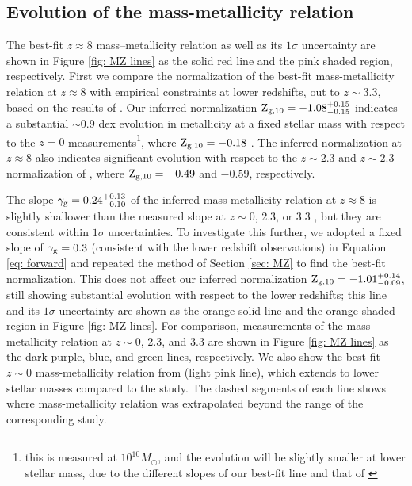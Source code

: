 \documentclass[twocolumn]{aastex631}
\begin{document}
\subsection{Evolution of the mass-metallicity relation} \label{sec: MZR}

The best-fit $z \approx 8$ mass--metallicity relation as well as its $1\sigma$ uncertainty are shown in Figure \ref{fig: MZ lines} as the solid red line and the pink shaded region, respectively. First we compare the normalization of the best-fit mass-metallicity relation at $z \approx 8$ with empirical constraints at lower redshifts, out to $z \sim 3.3$, based on the results of \cite{sanders+2021}. Our inferred normalization $\textnormal{Z}_{\textnormal{\scriptsize g,10}} = -1.08^{+0.15}_{-0.15}$ indicates a substantial $\sim 0.9$ dex evolution in metallicity at a fixed stellar mass with respect to the $z = 0$ measurements\footnote{this is measured at $10^{10} M_{\odot}$, and the evolution will be slightly smaller at lower stellar mass, due to the different slopes of our best-fit line and that of \cite{sanders+2021}}, where $\textnormal{Z}_{\textnormal{\scriptsize g,10}} = -0.18$ \citep[see also,][]{ma+2016, maiolino+2019}. The inferred normalization at $z \approx 8$ also indicates significant evolution with respect to the $z \sim 2.3$ and $z \sim 2.3$ normalization of \cite{sanders+2021}, where $\textnormal{Z}_{\textnormal{\scriptsize g,10}} = -0.49$ and $-0.59$, respectively.

The slope $\gamma_{\textnormal{\scriptsize g}} = 0.24^{+0.13}_{-0.10}$ of the inferred mass-metallicity relation at $z \approx 8$ is slightly shallower than the measured slope at $z \sim 0$, 2.3, or 3.3 \citep[0.28, 0.30, 0.29, respectively; see][]{sanders+2021}, but they are consistent within $1\sigma$ uncertainties. To investigate this further, we adopted a fixed slope of $\gamma_{\textnormal{\scriptsize g}} = 0.3$ (consistent with the lower redshift observations) in Equation \ref{eq: forward} and repeated the method of Section \ref{sec: MZ} to find the best-fit normalization. This does not affect our inferred normalization $\textnormal{Z}_{\textnormal{\scriptsize g,10}} = -1.01^{+0.14}_{-0.09}$, still showing substantial evolution with respect to the lower redshifts; this line and its $1\sigma$ uncertainty are shown as the orange solid line and the orange shaded region in Figure \ref{fig: MZ lines}.
For comparison, \cite{sanders+2021} measurements of the mass-metallicity relation at $z \sim 0$, 2.3, and 3.3 are shown in Figure \ref{fig: MZ lines} as the dark purple, blue, and green lines, respectively. We also show the best-fit $z \sim 0$ mass-metallicity relation from \cite{curti+2020b} (light pink line), which extends to lower stellar masses compared to the \cite{sanders+2021} study. The dashed segments of each line shows where mass-metallicity relation was extrapolated beyond the range of the corresponding study.
\end{document}
